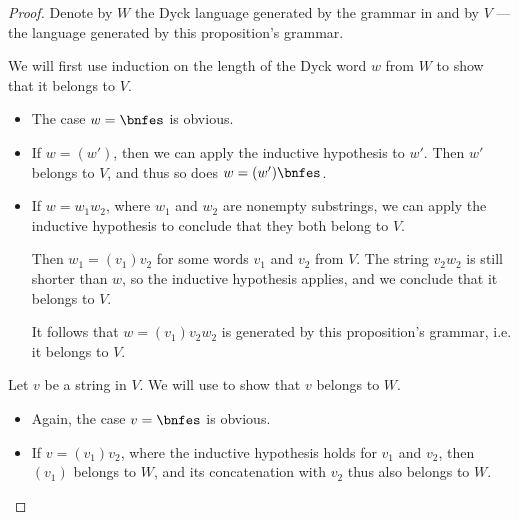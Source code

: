 \begin{proof}
  Denote by \( W \) the Dyck language generated by the grammar in  and by \( V \) --- the language generated by this proposition's grammar.

   We will first use induction on the length of the Dyck word \( w \) from \( W \) to show that it belongs to \( V \).

  \begin{itemize}
    \item The case \( w = \bnfes \) is obvious.

    \item If \( w = (w') \), then we can apply the inductive hypothesis to \( w' \). Then \( w' \) belongs to \( V \), and thus so does \( w = (w')\bnfes \).

    \item If \( w = w_1 w_2 \), where \( w_1 \) and \( w_2 \) are nonempty substrings, we can apply the inductive hypothesis to conclude that they both belong to \( V \).

    Then \( w_1 = (v_1) v_2 \) for some words \( v_1 \) and \( v_2 \) from \( V \). The string \( v_2 w_2 \) is still shorter than \( w \), so the inductive hypothesis applies, and we conclude that it belongs to \( V \).

    It follows that \( w = (v_1) v_2 w_2 \) is generated by this proposition's grammar, i.e. it belongs to \( V \).
  \end{itemize}

   Let \( v \) be a string in \( V \). We will use  to show that \( v \) belongs to \( W \).

  \begin{itemize}
    \item Again, the case \( v = \bnfes \) is obvious.

    \item If \( v = (v_1) v_2 \), where the inductive hypothesis holds for \( v_1 \) and \( v_2 \), then \( (v_1) \) belongs to \( W \), and its concatenation with \( v_2 \) thus also belongs to \( W \).
  \end{itemize}
\end{proof}

